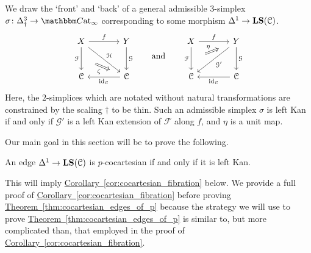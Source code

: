 \documentclass[main.tex]{subfiles}
\begin{document}
\begin{example}
  \label{eg:left_kan_morphism}
  We draw the `front' and `back' of a general admissible $3$-simplex $\sigma\colon \Delta^{3}_{\dagger} \to \ICCat$ corresponding to some morphism $\Delta^{1} \to \mathbf{LS}(\mathcal{C})$.
  \begin{equation*}
    \begin{tikzcd}[column sep=large, row sep=large]
      X
      \arrow[r, "f"]
      \arrow[d, "\mathcal{F}"{swap}, ""{name=L}]
      \arrow[dr, "\mathcal{H}"]
      & Y
      \arrow[d, "\mathcal{G}"]
      \\
      \category{C}
      & \category{C}
      \arrow[l, "\id_{\category{C}}"]
      \arrow[from=L, Rightarrow, shorten=3ex, "\zeta"{swap}]
    \end{tikzcd}
    \qquad\text{and}\qquad
    \begin{tikzcd}[column sep=large, row sep=large]
      X
      \arrow[r, "f"]
      \arrow[d, "\mathcal{F}"{swap}, ""{name=L}]
      & Y
      \arrow[d, "\mathcal{G}"]
      \arrow[dl, "\mathcal{G}'"]
      \arrow[from=L, Rightarrow, shorten=3ex, "\eta"]
      \\
      \category{C}
      & \category{C}
      \arrow[l, "\id_{\category{C}}"]
    \end{tikzcd}
  \end{equation*}
  Here, the $2$-simplices which are notated without natural transformations are constrained by the scaling $\dagger$ to be thin. Such an admissible simplex $\sigma$ is left Kan if and only if $\mathcal{G}'$ is a left Kan extension of $\mathcal{F}$ along $f$, and $\eta$ is a unit map.
\end{example}

Our main goal in this section will be to prove the following.

\begin{theorem}
  \label{thm:cocartesian_edges_of_p}
  An edge $\Delta^{1} \to \mathbf{LS}(\mathcal{C})$ is $p$-cocartesian if and only if it is left Kan.
\end{theorem}

This will imply \hyperref[cor:cocartesian_fibration]{Corollary~\ref*{cor:cocartesian_fibration}} below. We provide a full proof of \hyperref[cor:cocartesian_fibration]{Corollary~\ref*{cor:cocartesian_fibration}} before proving \hyperref[thm:cocartesian_edges_of_p]{Theorem~\ref*{thm:cocartesian_edges_of_p}} because the strategy we will use to prove \hyperref[thm:cocartesian_edges_of_p]{Theorem~\ref*{thm:cocartesian_edges_of_p}} is similar to, but more complicated than, that employed in the proof of \hyperref[cor:cocartesian_fibration]{Corollary~\ref*{cor:cocartesian_fibration}}.
\end{document}

